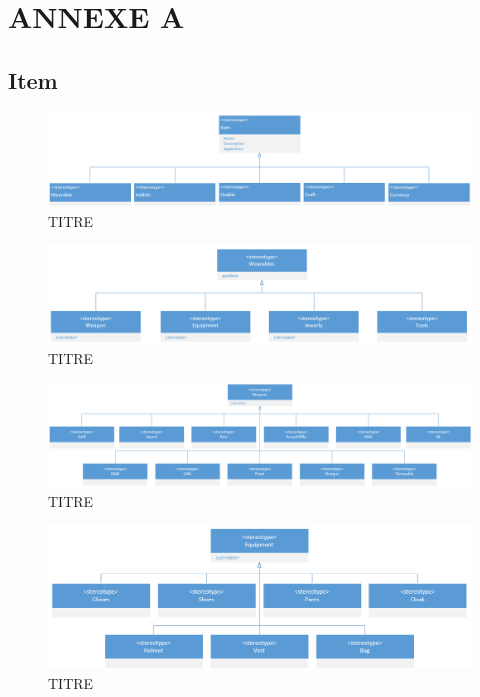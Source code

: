 \chapter*{ANNEXE A}

\section*{Item}
\begin{figure}[H]
    \centering
    \includegraphics[width=14cm]{10_img/chap5/01_00_item.PNG} 
    \caption{TITRE}
\end{figure}
\begin{figure}[H]
    \centering
    \includegraphics[width=14cm]{10_img/chap5/01_01_wearable.PNG} 
    \caption{TITRE}
\end{figure}
\begin{figure}[H]
    \centering
    \includegraphics[width=14cm]{10_img/chap5/01_01_01_weapon.PNG} 
    \caption{TITRE}
\end{figure}
\begin{figure}[H]
    \centering
    \includegraphics[width=14cm]{10_img/chap5/01_01_02_equipment.PNG} 
    \caption{TITRE}
\end{figure}
